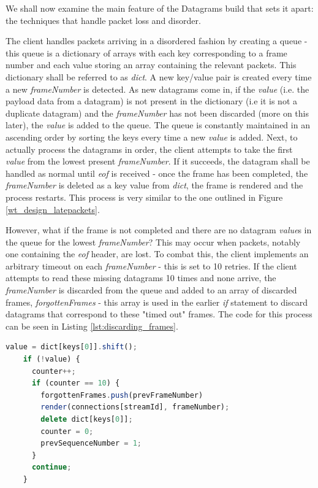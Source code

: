 We shall now examine the main feature of the Datagrams build that sets it apart: the techniques that handle packet loss and disorder. 

The client handles packets arriving in a disordered fashion by creating a queue - this queue is a dictionary of arrays with each key corresponding to a frame number and each value storing an array containing the relevant packets. This dictionary shall be referred to as \textit{dict}. A new key/value pair is created every time a new \textit{frameNumber} is detected. As new datagrams come in, if the \textit{value} (i.e. the payload data from a datagram) is not present in the dictionary (i.e it is not a duplicate datagram) and the \textit{frameNumber} has not been discarded (more on this later), the \textit{value} is added to the queue. The queue is constantly maintained in an ascending order by sorting the keys every time a new \textit{value} is added. Next, to actually process the datagrams in order, the client attempts to take the first \textit{value} from the lowest present \textit{frameNumber}. If it succeeds, the datagram shall be handled as normal until \textit{eof} is received - once the frame has been completed, the \textit{frameNumber} is deleted as a key value from \textit{dict}, the frame is rendered and the process restarts. This process is very similar to the one outlined in Figure \ref{wt_design_latepackets}.

However, what if the frame is not completed and there are no datagram \textit{value}s in the queue for the lowest \textit{frameNumber}? This may occur when packets, notably one containing the \textit{eof} header, are lost. To combat this, the client implements an arbitrary timeout on each \textit{frameNumber} - this is set to 10 retries. If the client attempts to read these missing datagrams 10 times and none arrive, the \textit{frameNumber} is discarded from the queue and added to an array of discarded frames, \textit{forgottenFrames} - this array is used in the earlier \textit{if} statement to discard datagrams that correspond to these "timed out" frames. The code for this process can be seen in Listing \ref{lst:discarding_frames}.

\begin{lstlisting}[language=javascript, caption={Datagrams build's client handling timed out frames.}, label=lst:discarding_frames]
    value = dict[keys[0]].shift();
    if (!value) {
      counter++;
      if (counter == 10) {
        forgottenFrames.push(prevFrameNumber)
        render(connections[streamId], frameNumber);
        delete dict[keys[0]];
        counter = 0;
        prevSequenceNumber = 1;
      }
      continue;
    }
\end{lstlisting}

